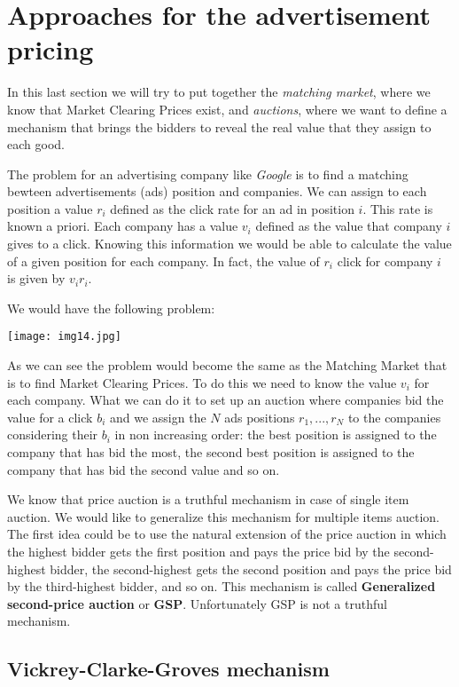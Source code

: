 \section{Approaches for the advertisement pricing}\label{sec:ads}

In this last section we will try to put together the \textit{matching market}, where we know that Market Clearing Prices exist, and \textit{auctions}, where we want to define a mechanism that brings the bidders to reveal the real value that they assign to each good.

The problem for an advertising company like \textit{Google} is to find a matching bewteen advertisements (ads) position and companies. We can assign to each position a value $r_i$ defined as the click rate for an ad in position $i$. This rate is known a priori. Each company has a value $v_i$ defined as the value that company $i$ gives to a click. Knowing this information we would be able to calculate the value of a given position for each company. In fact, the value of $r_i$ click for company $i$ is given by $v_ir_i$.

We would have the following problem:

\centerline{
\texttt{[image: img14.jpg]}}

As we can see the problem would become the same as the Matching Market that is to find Market Clearing Prices. To do this we need to know the value $v_i$ for each company. What we can do it to set up an auction where companies bid the value for a click $b_i$ and we assign the $N$ ads positions $r_1,...,r_N$ to the companies considering their $b_i$ in non increasing order: the best position is assigned to the company that has bid the most, the second best position is assigned to the company that has bid the second value and so on.

We know that  price auction is a truthful mechanism in case of single item auction. We would like to generalize this mechanism for multiple items auction. The first idea could be to use the natural extension of the  price auction in which the highest bidder gets the first position and pays the price bid by the second-highest bidder, the second-highest gets the second position and pays the price bid by the third-highest bidder, and so on. This mechanism is called \textbf{Generalized second-price auction} or \textbf{GSP}. Unfortunately GSP is not a truthful mechanism.

\subsection{Vickrey-Clarke-Groves mechanism}\label{subsec:VCG}

